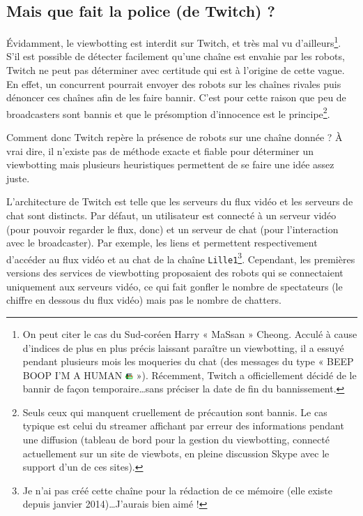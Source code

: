 \documentclass[a4paper]{article}
\begin{document}
\subsection{Mais que fait la police (de Twitch) ?}

Évidamment, le viewbotting est interdit sur Twitch, et très mal vu d'ailleurs\footnote{On peut citer le cas du Sud-coréen Harry « MaSsan » Cheong. Acculé à cause d'indices de plus en plus précis laissant paraître un viewbotting, il a essuyé pendant plusieurs mois les moqueries du chat (des messages du type « BEEP BOOP I'M A HUMAN \includegraphics[width=0.3cm]{MrDestructoid.png} »). Récemment, Twitch a officiellement décidé de le bannir de façon temporaire\ldots sans préciser la date de fin du bannissement.}. S'il est possible de détecter facilement qu'une chaîne est envahie par les robots, Twitch ne peut pas déterminer avec certitude qui est à l'origine de cette vague. En effet, un concurrent pourrait envoyer des robots sur les chaînes rivales puis dénoncer ces chaînes afin de les faire bannir. C'est pour cette raison que peu de broadcasters sont bannis et que le présomption d'innocence est le principe\footnote{Seuls ceux qui manquent cruellement de précaution sont bannis. Le cas typique est celui du streamer affichant par erreur des informations pendant une diffusion (tableau de bord pour la gestion du viewbotting, connecté actuellement sur un site de viewbots, en pleine discussion Skype avec le support d'un de ces sites).}. 

Comment donc Twitch repère la présence de robots sur une chaîne donnée ? À vrai dire, il n'existe pas de méthode exacte et fiable pour déterminer un viewbotting mais plusieurs heuristiques permettent de se faire une idée assez juste. 

L'architecture de Twitch est telle que les serveurs du flux vidéo et les serveurs de chat sont distincts. Par défaut, un utilisateur est connecté à un serveur vidéo (pour pouvoir regarder le flux, donc) et un serveur de chat (pour l'interaction avec le broadcaster). Par exemple, les liens  et  permettent respectivement d'accéder au flux vidéo et au chat de la chaîne \verb|Lille1|\footnote{Je n'ai pas créé cette chaîne pour la rédaction de ce mémoire (elle existe depuis janvier 2014)\ldots J'aurais bien aimé !}. Cependant, les premières versions des services de viewbotting proposaient des robots qui se connectaient uniquement aux serveurs vidéo, ce qui fait gonfler le nombre de spectateurs (le chiffre en dessous du flux vidéo) mais pas le nombre de chatters. 
\end{document}
